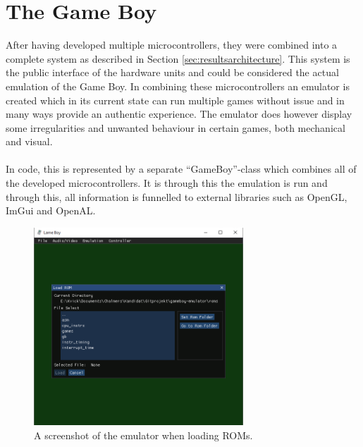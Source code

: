 \section{The Game Boy}
After having developed multiple microcontrollers, they were combined into a complete system as described in Section \ref{sec:resultsarchitecture}. This system is the public interface of the hardware units and could be considered the actual emulation of the Game Boy. In combining these microcontrollers an emulator is created which in its current state can run multiple games without issue and in many ways provide an authentic experience. The emulator does however display some irregularities and unwanted behaviour in certain games, both mechanical and visual.
\\\\
In code, this is represented by a separate ``GameBoy''-class which combines all of the developed microcontrollers. It is through this the emulation is run and through this, all information is funnelled to external libraries such as OpenGL, ImGui and OpenAL.

\begin{figure}[H]
    \centering
    \includegraphics[width=0.7\textwidth]{figures/emulator.png}
    \caption{A screenshot of the emulator when loading ROMs.}
    \label{fig:emulator_picture}
\end{figure}
